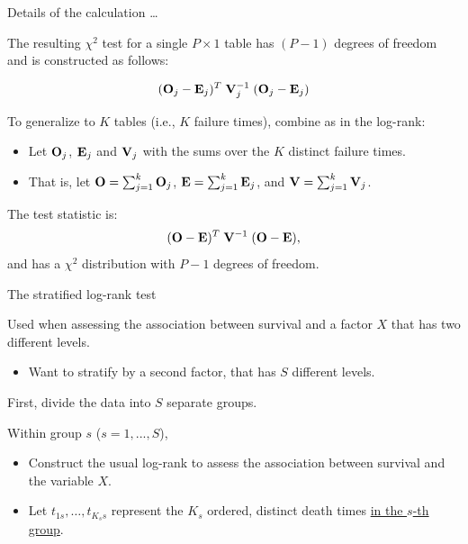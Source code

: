 \documentclass[ignorenonframetext,]{beamer}
\providecommand{\tightlist}{%
  \setlength{\itemsep}{0pt}\setlength{\parskip}{0pt}}
\begin{document}
\begin{frame}{%
\protect\hypertarget{details-of-the-calculation-2}{%
Details of the calculation \ldots}}

The resulting \(\chi^2\) test for a single \(P \times 1\) table has
\((P-1)\) degrees of freedom and is constructed as follows:

\[   ( {\bf O}_j - {\bf E}_j)^T \; {\bf V}^{-1}_j \; ( {\bf O}_j - {\bf E}_j)
\]

To generalize to \(K\) tables (i.e., \(K\) failure times), combine as in
the log-rank:

\begin{itemize}
\item
  Let \({\bf O}_j\), \({\bf E}_j\) and \({\bf V}_j\) with the sums over
  the \(K\) distinct failure times.
\item
  That is, let \({\bf O} = \sum_{j=1}^{k} {\bf O}_j\),
  \({\bf E} = \sum_{j=1}^{k} {\bf E}_j\), and
  \({\bf V} = \sum_{j=1}^{k} {\bf V}_j\).
\end{itemize}

The test statistic is: \[
 ( {\bf O} - {\bf E})^T \; {\bf V}^{-1} \; ( {\bf O} - {\bf E}),
\] and has a \(\chi^2\) distribution with \(P - 1\) degrees of freedom.

\end{frame}

\begin{frame}{%
\protect\hypertarget{the-stratified-log-rank-test-1}{%
The stratified log-rank test}}

Used when assessing the association between survival and a factor \(X\)
that has two different levels.

\begin{itemize}
\tightlist
\item
  Want to stratify by a second factor, that has \(S\) different levels.
\end{itemize}

First, divide the data into \(S\) separate groups.

Within group \(s\) (\(s=1,...,S\)),

\begin{itemize}
\item
  Construct the usual log-rank to assess the association between
  survival and the variable \(X\).
\item
  Let \(t_{1s}, \ldots ,t_{K_s s}\) represent the \(K_s\) ordered,
  distinct death times \underline{in the $s$-th group}.
\end{itemize}

\end{frame}
\end{document}
